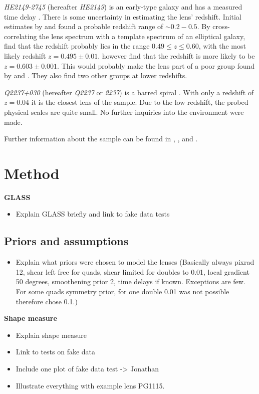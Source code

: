 \documentclass[useAMS,usenatbib]{mn2e}
\begin{document}
\textit{HE2149-2745} (hereafter \textit{HE2149}) is an early-type galaxy \citep{2007A&A...465...51E} and has a measured time delay \citep{2002A&A...383...71B}. There is some uncertainty in estimating the lens' redshift. Initial estimates by \cite{1996A&A...315L.405W} and \cite{2000ApJ...543..131K} found a probable redshift range of $\sim0.2-0.5$. By cross-correlating the lens spectrum with a template spectrum of an elliptical galaxy, \cite{2002A&A...383...71B} find that the redshift probably lies in the range $0.49\leq z \leq 0.60$, with the most likely redshift $z=0.495\pm0.01$. \cite{2007A&A...465...51E} however find that the redshift is more likely to be $z=0.603\pm0.001$. This would probably make the lens part of a poor group found by \cite{2006ApJ...641..169M} and \cite{2006ApJ...646...85W}. They also find two other groups at lower redshifts.

\textit{Q2237+030} (hereafter \textit{Q2237} or \textit{2237}) is a barred spiral \citep{1988AJ.....95.1331Y}. With only a redshift of $z=0.04$ it is the closest lens of the sample. Due to the low redshift, the probed physical scales are quite small. No further inquiries into the environment were made.

Further information about the sample can be found in \cite{leier11phd}, \cite{2011ApJ...740...97L}, and \cite{2012A&A...538A..99S}.


\section{Method}\label{sec:method}
\textbf{GLASS}
\begin{itemize}
\item Explain GLASS briefly and link to fake data tests
\end{itemize}

\subsection{Priors and assumptions}
\begin{itemize}
\item Explain what priors were chosen to model the lenses (Basically always pixrad 12, shear left free for quads, shear limited for doubles to 0.01, local gradient 50 degrees, smoothening prior 2, time delays if known. Exceptions are few. For some quads symmetry prior, for one double 0.01 was not possible therefore chose 0.1.)
\end{itemize}

\textbf{Shape measure}
\begin{itemize}
\item Explain shape measure
\item Link to tests on fake data
\item Include one plot of fake data test -> Jonathan
\item Illustrate everything with example lens PG1115.
\end{itemize}
\end{document}
